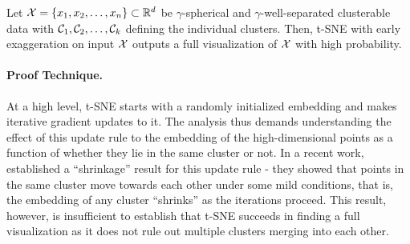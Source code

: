\begin{thm}[Informal] \label{thm:full-vis-main-intro}
	Let $\mathcal{X} = \{x_1, x_2, \ldots, x_n\} \subset \mathbb{R}^d$ be $\gamma$-spherical and $\gamma$-well-separated clusterable data with $\mathcal{C}_1, \mathcal{C}_2,\ldots, \mathcal{C}_k$ defining the individual clusters. 
	Then, t-SNE with early exaggeration on input $\mathcal{X}$ outputs a full visualization of $\mathcal{X}$ with high probability.  
\end{thm}

\paragraph{Proof Technique.}
At a high level, t-SNE starts with a randomly initialized embedding and makes iterative gradient updates to it. The analysis thus demands understanding the effect of this update rule to the embedding of the high-dimensional points as a function of whether they lie in the same cluster or not.  In a recent work, \citet{linderman2017clustering} established a ``shrinkage'' result for this update rule - they showed that points in the same cluster move towards each other under some mild conditions, that is, the embedding of any cluster ``shrinks'' as the iterations proceed. This result, however, is insufficient to establish that t-SNE succeeds in finding a full visualization as it does not rule out multiple clusters merging into each other. 

